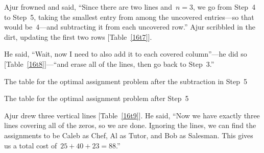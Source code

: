 Ajur frowned and said, ``Since there are two lines and~$n=3$, we go from Step~4 to Step~5, taking the smallest entry from among the uncovered entries---so that would be~4---and subtracting it from each uncovered row.'' Ajur scribbled in the dirt, updating the first two rows [Table~\ref{16t7}].

He said, ``Wait, now I need to also add it to each covered column''---he did so [Table~\ref{16t8}]---``and erase all of the lines, then go back to Step~3.''

\begin{table}
\begin{center}

\caption{The table for the optimal assignment problem after the subtraction in Step~5}\label{16t7}
\end{center}
\end{table}
\begin{table}
\begin{center}

\caption{The table for the optimal assignment problem after Step~5}\label{16t8}
\end{center}
\end{table}

Ajur drew three vertical lines [Table~\ref{16t9}]. He said, ``Now we have exactly three lines covering all of the zeros, so we are done. Ignoring the lines, we can find the assignments to be Caleb as Chef, Al as Tutor, and Bob as Salesman. This gives us a total cost of~$25+40+23=88$.''

